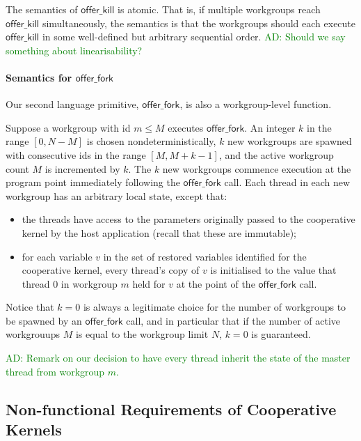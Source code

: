 \documentclass[nocopyrightspace]{sigplanconf-pldi16}
\newcommand{\ADComment}[1]{\textcolor{green}{AD: #1}}
\newcommand{\offerfork}{\mathsf{offer\_fork}}
\newcommand{\offerkill}{\mathsf{offer\_kill}}
\begin{document}
The semantics of $\offerkill$ is atomic.  That is, if multiple
workgroups reach $\offerkill$ simultaneously, the semantics is that
the workgroups should each execute $\offerkill$ in some well-defined
but arbitrary sequential order.  \ADComment{Should we say something
  about linearisability?}

\paragraph{Semantics for $\offerfork$}

Our second language primitive, $\offerfork$, is also a workgroup-level
function.

Suppose a workgroup with id $m\leq M$ executes $\offerfork$.  An
integer $k$ in the range $[0, N-M]$ is chosen nondeterministically,
$k$ new workgroups are spawned with consecutive ids in the range $[M,
  M+k-1]$, and the active workgroup count $M$ is incremented by $k$.
The $k$ new workgroups commence execution at the program point
immediately following the $\offerfork$ call.  Each thread in each new
workgroup has an arbitrary local state, except that:

\begin{itemize}

\item the threads have access to the parameters originally passed to
  the cooperative kernel by the host application (recall that these
  are immutable);

\item for each variable $v$ in the set of restored variables
  identified for the cooperative kernel, every thread's copy of $v$ is
  initialised to the value that thread 0 in workgroup $m$ held for $v$
  at the point of the $\offerfork$ call.

\end{itemize}

Notice that $k=0$ is always a legitimate choice for the number of
workgroups to be spawned by an $\offerfork$ call, and in particular
that if the number of active workgrouups $M$ is equal to the workgroup
limit $N$, $k=0$ is guaranteed.

\ADComment{Remark on our decision to have every thread inherit the state of the master thread from workgroup $m$.}



\subsection{Non-functional Requirements of Cooperative Kernels}
\end{document}

